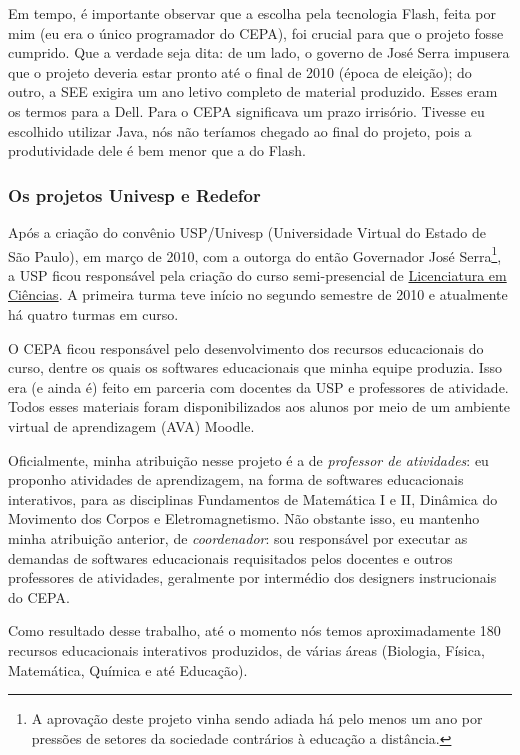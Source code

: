 Em tempo, é importante observar que a escolha pela tecnologia Flash, feita por mim (eu era o único programador do CEPA), foi crucial para que o projeto fosse cumprido. Que a verdade seja dita: de um lado, o governo de José Serra impusera que o projeto deveria estar pronto até o final de 2010 (época de eleição); do outro, a SEE exigira um ano letivo completo de material produzido. Esses eram os termos para a Dell. Para o CEPA significava um prazo irrisório. Tivesse eu escolhido utilizar Java, nós não teríamos chegado ao final do projeto, pois a produtividade dele é bem menor que a do Flash.

\subsubsection{Os projetos Univesp e Redefor}

Após a criação do convênio USP/Univesp (Universidade Virtual do Estado de São Paulo), em março de 2010, com a outorga do então Governador José Serra\footnote{A aprovação deste projeto vinha sendo adiada há pelo menos um ano por pressões de setores da sociedade contrários à educação a distância.}, a USP ficou responsável pela criação do curso semi-presencial de \href{http://licenciaturaciencias.usp.br/}{Licenciatura em Ciências}. A primeira turma teve início no segundo semestre de 2010 e atualmente há quatro turmas em curso.

O CEPA ficou responsável pelo desenvolvimento dos recursos educacionais do curso, dentre os quais os softwares educacionais que minha equipe produzia. Isso era (e ainda é) feito em parceria com docentes da USP e professores de atividade. Todos esses materiais foram disponibilizados aos alunos por meio de um ambiente virtual de aprendizagem (AVA) Moodle.

Oficialmente, minha atribuição nesse projeto é a de \emph{professor de atividades}: eu proponho atividades de aprendizagem, na forma de softwares educacionais interativos, para as disciplinas Fundamentos de Matemática I e II, Dinâmica do Movimento dos Corpos e Eletromagnetismo. Não obstante isso, eu mantenho minha atribuição anterior, de \emph{coordenador}: sou responsável por executar as demandas de softwares educacionais requisitados pelos docentes e outros professores de atividades, geralmente por intermédio dos designers instrucionais do CEPA.

Como resultado desse trabalho, até o momento nós temos aproximadamente 180 recursos educacionais interativos produzidos, de várias áreas (Biologia, Física, Matemática, Química e até Educação).

